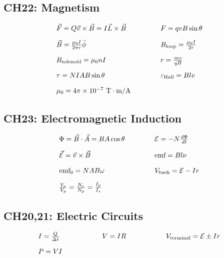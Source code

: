 \documentclass[12pt,a4paper]{article}
\begin{document}
\subsection{CH22: Magnetism}
\begin{align*}
  \begin{array}{l@{\hspace{1.5cm}}l}
    \vec{F} = Q\vec{v} \times \vec{B} = I\vec{L} \times \vec{B} & F = qvB\sin\theta \\[1em]
    \vec{B} = \frac{\mu_0 I}{2\pi r}\hat{\phi} & B_{\text{loop}} = \frac{\mu_0 I}{2r} \\[1em]
    B_{\text{solenoid}} = \mu_0 nI & r = \frac{mv}{qB} \\[1em]
    \tau = NIAB\sin\theta & \varepsilon_{\text{Hall}} = Blv \\[1em]
    \mu_0 = 4\pi \times 10^{-7} \text{ T}\cdot\text{m/A} & \\
  \end{array}
\end{align*}

\subsection{CH23: Electromagnetic Induction}
\begin{align*}
  \begin{array}{l@{\hspace{1.5cm}}l}
    \Phi = \vec{B} \cdot \vec{A} = BA\cos\theta & \mathcal{E} = -N\frac{d\Phi}{dt} \\[1em]
    \vec{\mathcal{E}} = \vec{v} \times \vec{B} & \text{emf} = Bl\nu \\[1em]
    \text{emf}_0 = NAB\omega & V_{\text{back}} = \mathcal{E} - Ir \\[1em]
    \frac{V_s}{V_p} = \frac{N_s}{N_p} = \frac{I_p}{I_s} & \\
  \end{array}
\end{align*}

\iffalse

\subsection{CH20,21: Electric Circuits}
\begin{align*}
  \begin{array}{l@{\hspace{2cm}}l@{\hspace{2cm}}l}
    I = \frac{Q}{\Delta t} & V = IR & V_\text{terminal} = \mathcal{E} \pm Ir \\[1em]
    P = VI & &
  \end{array}
\end{align*}
\end{document}
